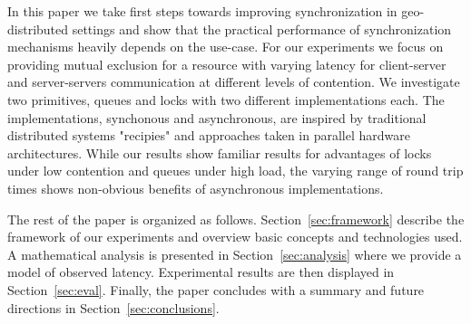 In this paper we take first steps towards improving synchronization in geo-distributed settings and show that the practical performance of synchronization mechanisms heavily depends on the use-case. For our experiments we focus on providing mutual exclusion for a resource with varying latency for client-server and server-servers communication at different levels of contention. We investigate two primitives, queues and locks with two different implementations each. The implementations, synchonous and asynchronous, are inspired by traditional distributed systems "recipies" and approaches taken in parallel hardware architectures. While our results show familiar results for advantages of locks under low contention and queues under high load, the varying range of round trip times shows non-obvious benefits of asynchronous implementations.

The rest of the paper is organized as follows. Section~\ref{sec:framework} describe the framework of our experiments and overview basic concepts and technologies used. A mathematical analysis is presented in Section~\ref{sec:analysis} where we provide a model of observed latency. Experimental results are then displayed in Section~\ref{sec:eval}. Finally, the paper concludes with a summary and future directions in Section~\ref{sec:conclusions}.